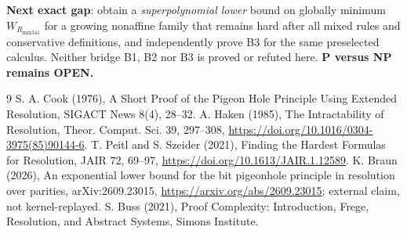 \documentclass[11pt]{article}
\begin{document}
\textbf{Next exact gap}: obtain a \emph{superpolynomial lower} bound on globally minimum $W_{R_{\mathrm{mix341}}}$ for a growing nonaffine family that remains hard after all mixed rules and conservative definitions, and independently prove B3 for the same preselected calculus. Neither bridge B1, B2 nor B3 is proved or refuted here. \textbf{P versus NP remains OPEN.}

\begin{thebibliography}{9}
 S. A. Cook (1976), A Short Proof of the Pigeon Hole Principle Using Extended Resolution, SIGACT News 8(4), 28--32.
 A. Haken (1985), The Intractability of Resolution, Theor. Comput. Sci. 39, 297--308, \url{https://doi.org/10.1016/0304-3975(85)90144-6}.
 T. Peitl and S. Szeider (2021), Finding the Hardest Formulas for Resolution, JAIR 72, 69--97, \url{https://doi.org/10.1613/JAIR.1.12589}.
 K. Braun (2026), An exponential lower bound for the bit pigeonhole principle in resolution over parities, arXiv:2609.23015, \url{https://arxiv.org/abs/2609.23015}; external claim, not kernel-replayed.
 S. Buss (2021), Proof Complexity: Introduction, Frege, Resolution, and Abstract Systems, Simons Institute.
\end{thebibliography}
\end{document}

